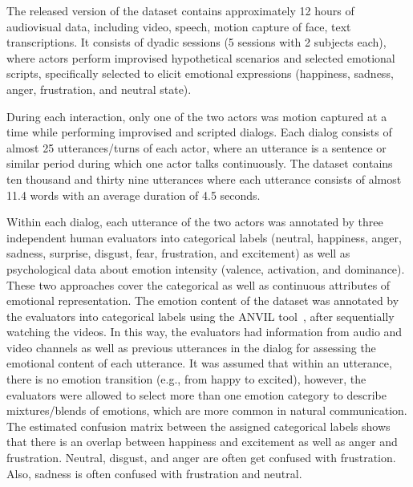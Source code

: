 \documentclass[10pt,journal,cspaper,compsoc]{IEEEtran}
\begin{document}
The released version of the dataset contains approximately 12 hours of audiovisual data, including video, speech, motion capture of face, text transcriptions. It consists of dyadic sessions (5 sessions with 2 subjects each), where actors perform improvised hypothetical scenarios and selected emotional scripts, specifically selected to elicit emotional expressions (happiness, sadness, anger, frustration, and neutral state).

During each interaction, only one of the two actors was motion captured at a time while performing improvised and scripted dialogs. Each dialog consists of almost 25 utterances/turns of each actor, where an utterance is a sentence or similar period during which one actor talks continuously. The dataset contains ten thousand and thirty nine utterances where each utterance consists of almost 11.4 words with an average duration of 4.5 seconds. 

Within each dialog, each utterance of the two actors was annotated by three independent human evaluators into categorical labels (neutral, happiness, anger, sadness, surprise, disgust, fear, frustration, and excitement) as well as psychological data about emotion intensity (valence, activation, and dominance). These two approaches cover the categorical as well as continuous attributes of emotional representation. The emotion content of the dataset was annotated by the evaluators into categorical labels using the ANVIL tool~\cite{Kipp2001Anvil}, after sequentially watching the videos. In this way, the evaluators had information from audio and video channels as well as previous utterances in the dialog for assessing the emotional content of each utterance. It was assumed that within an utterance, there is no emotion transition (e.g., from happy to excited), however, the evaluators were allowed to select more than one emotion category to describe mixtures/blends of emotions, which are more common in natural communication. The estimated confusion matrix between the assigned categorical labels shows that there is an overlap between happiness and excitement as well as anger and frustration. Neutral, disgust, and anger are often get confused with frustration. Also, sadness is often confused with frustration and neutral.

\end{document}
